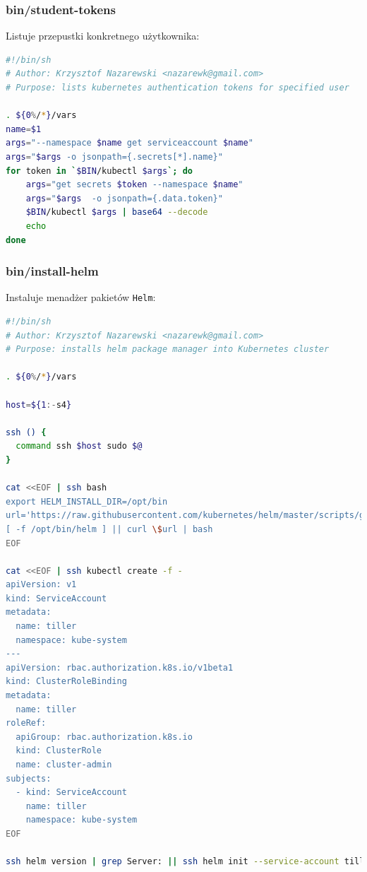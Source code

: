 \documentclass[a4paper,12pt,twoside,openany]{report}
\newcommand{\passthrough}[1]{#1}
\begin{document}
\hypertarget{binstudent-tokens}{%
\subsubsection{bin/student-tokens}\label{binstudent-tokens}}

Listuje przepustki konkretnego użytkownika:

\begin{lstlisting}[language=bash]
#!/bin/sh
# Author: Krzysztof Nazarewski <nazarewk@gmail.com>
# Purpose: lists kubernetes authentication tokens for specified user

. ${0%/*}/vars
name=$1
args="--namespace $name get serviceaccount $name"
args="$args -o jsonpath={.secrets[*].name}"
for token in `$BIN/kubectl $args`; do
    args="get secrets $token --namespace $name"
    args="$args  -o jsonpath={.data.token}"
    $BIN/kubectl $args | base64 --decode
    echo
done
\end{lstlisting}

\hypertarget{bininstall-helm}{%
\subsubsection{bin/install-helm}\label{bininstall-helm}}

Instaluje menadżer pakietów \passthrough{\lstinline!Helm!}:

\begin{lstlisting}[language=bash]
#!/bin/sh
# Author: Krzysztof Nazarewski <nazarewk@gmail.com>
# Purpose: installs helm package manager into Kubernetes cluster

. ${0%/*}/vars

host=${1:-s4}

ssh () {
  command ssh $host sudo $@
}

cat <<EOF | ssh bash
export HELM_INSTALL_DIR=/opt/bin
url='https://raw.githubusercontent.com/kubernetes/helm/master/scripts/get'
[ -f /opt/bin/helm ] || curl \$url | bash
EOF

cat <<EOF | ssh kubectl create -f -
apiVersion: v1
kind: ServiceAccount
metadata:
  name: tiller
  namespace: kube-system
---
apiVersion: rbac.authorization.k8s.io/v1beta1
kind: ClusterRoleBinding
metadata:
  name: tiller
roleRef:
  apiGroup: rbac.authorization.k8s.io
  kind: ClusterRole
  name: cluster-admin
subjects:
  - kind: ServiceAccount
    name: tiller
    namespace: kube-system
EOF

ssh helm version | grep Server: || ssh helm init --service-account tiller
\end{lstlisting}
\end{document}
